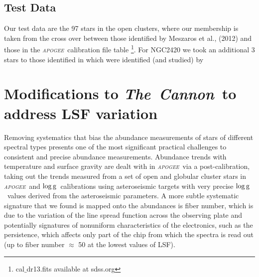 \documentclass[14pt, preprint2]{aastex6}
\newcommand{\project}[1]{\textsl{#1}}
\newcommand{\tc}{\project{The~Cannon}}
\newcommand{\apogee}{\project{\textsc{apogee}}}
\newcommand{\logg}{\mbox{$\rm \log g$}}
\begin{document}
\subsection{Test Data} 

Our test data are the 97 stars in the open clusters, where our membership is taken from the cross over between those identified by Meszaros et al., (2012) and those in the \apogee\ calibration file table \footnote{cal$\_$dr13.fits available at sdss.org}. For NGC2420 we took an additional 3 stars to those identified in \citet{Meszaros2013}  which were identified (and studied) by \citet{Souto2016}

\section{Modifications to \tc\ to address LSF variation}

Removing systematics that bias the abundance measurements of stars of different spectral types presents one of the most significant practical challenges to consistent and precise abundance measurements. Abundance trends with temperature and surface gravity are dealt with in \apogee\ via a post-calibration, taking out the trends measured from a set of open and globular cluster stars in \apogee\ and \logg\ calibrations using asteroseismic targets with very precise \logg\ values derived from the asteroseismic parameters. A more subtle systematic signature that we found is mapped onto the abundances is fiber number, which is due to the variation of the line spread function across the observing plate and potentially signatures of nonuniform characteristics of the electronics, such as the persistence, which affects only part of the chip from which the spectra is read out (up to fiber number $\approx$ 50 at the lowest values of LSF). 
\end{document}
